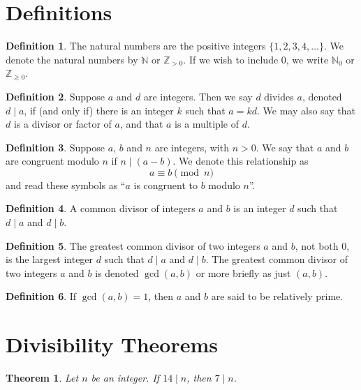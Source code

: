 \documentclass{article}
\newtheorem*{theorem*}{Theorem}
\theoremstyle{definition}
\newtheorem*{definition*}{Definition}
\begin{document}
\section{Definitions}

\begin{definition*}
The natural numbers are the positive integers $\{1, 2, 3, 4, \ldots\}$. We denote the natural numbers by $\mathbb{N}$ or $\mathbb{Z}_{>0}$. If we wish to include $0$, we write $\mathbb{N}_0$ or $\mathbb{Z}_{\geq 0}$.
\end{definition*}

\begin{definition*}
Suppose $a$ and $d$ are integers. Then we say $d$ divides $a$, denoted $d \mid a$, if (and only if) there is an integer $k$ such that $a = kd$. We may also say that $d$ is a divisor or factor of $a$, and that $a$ is a multiple of $d$.
\end{definition*}

\begin{definition*}
Suppose $a$, $b$ and $n$ are integers, with $n > 0$. We say that $a$ and $b$ are congruent modulo $n$ if $n \mid (a - b)$. We denote this relationship as
\[a \equiv b \pmod{n}\]
and read these symbols as ``$a$ is congruent to $b$ modulo $n$''.
\end{definition*}

\begin{definition*}
A common divisor of integers $a$ and $b$ is an integer $d$ such that $d \mid a$ and $d \mid b$.
\end{definition*}

\begin{definition*}
The greatest common divisor of two integers $a$ and $b$, not both $0$, is the largest integer $d$ such that $d \mid a$ and $d \mid b$. The greatest common divisor of two integers $a$ and $b$ is denoted $\gcd(a, b)$ or more briefly as just $(a, b)$.
\end{definition*}

\begin{definition*}
If $\gcd(a, b) = 1$, then $a$ and $b$ are said to be relatively prime.
\end{definition*}

\section{Divisibility Theorems}

\begin{theorem*}
Let $n$ be an integer. If $14 \mid n$, then $7 \mid n$.
\end{theorem*}
\end{document}
